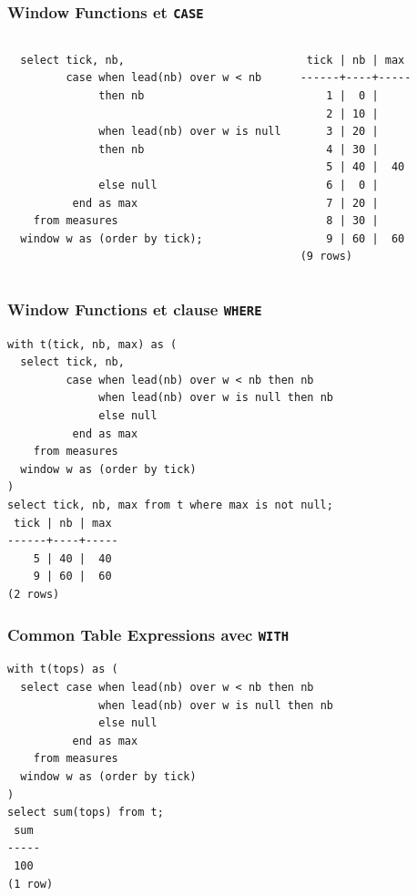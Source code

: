 \documentclass{beamer}
\begin{document}
\begin{frame}[fragile]
  \frametitle{Window Functions et \texttt{CASE}}

\begin{columns}
\begin{verbatim}
  select tick, nb,
         case when lead(nb) over w < nb
              then nb

              when lead(nb) over w is null
              then nb

              else null
          end as max
    from measures
  window w as (order by tick);
\end{verbatim}
\begin{verbatim}
 tick | nb | max 
------+----+-----
    1 |  0 |    
    2 | 10 |    
    3 | 20 |    
    4 | 30 |    
    5 | 40 |  40
    6 |  0 |    
    7 | 20 |    
    8 | 30 |    
    9 | 60 |  60
(9 rows)
\end{verbatim}
\end{columns}
\end{frame}

\begin{frame}[fragile]
  \frametitle{Window Functions et clause \texttt{WHERE}}

\begin{verbatim}
with t(tick, nb, max) as (
  select tick, nb,
         case when lead(nb) over w < nb then nb
              when lead(nb) over w is null then nb
              else null
          end as max
    from measures
  window w as (order by tick)
)
select tick, nb, max from t where max is not null;
 tick | nb | max 
------+----+-----
    5 | 40 |  40
    9 | 60 |  60
(2 rows)
\end{verbatim}
\end{frame}

\begin{frame}[fragile]
  \frametitle{Common Table Expressions avec \texttt{WITH}}

\begin{verbatim}
with t(tops) as (
  select case when lead(nb) over w < nb then nb
              when lead(nb) over w is null then nb
              else null
          end as max
    from measures
  window w as (order by tick)
)
select sum(tops) from t;
 sum 
-----
 100
(1 row)
\end{verbatim}
\end{frame}
\end{document}
